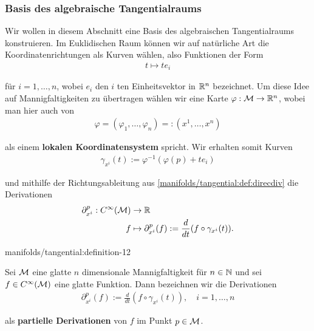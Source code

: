 \subsubsection{Basis des algebraische Tangentialraums}
\label{\detokenize{manifolds/tangential:basis-des-algebraische-tangentialraums}}\label{\detokenize{manifolds/tangential:sec-tpbasis}}
\par
Wir wollen in diesem Abschnitt eine Basis des algebraischen Tangentialraums konstruieren.
Im Euklidischen Raum können wir auf natürliche Art die Koordinatenrichtungen als Kurven wählen, also Funktionen der Form
\begin{align*}
t \mapsto t e_i
\end{align*}
\par
für \(i=1,\ldots,n\), wobei \(e_i\) den \(i\) ten Einheitsvektor in \(\mathbb{R}^n\) bezeichnet.
Um diese Idee auf Mannigfaltigkeiten zu übertragen wählen wir eine Karte \(\varphi:\mathcal{M}\to\mathbb{R}^n\), wobei man hier auch von
\begin{align*}
\varphi = (\varphi_1,\ldots,\varphi_n) =: (x^1,\ldots,x^n)
\end{align*}
\par
als einem \textbf{lokalen Koordinatensystem} spricht.
Wir erhalten somit Kurven
\begin{align*}
\gamma_{x^i}(t):= \varphi^{-1}(\varphi(p) + t e_i)
\end{align*}
\par
und mithilfe der Richtungsableitung aus \cref{manifolds/tangential:def:direcdiv} die Derivationen
\begin{align*}
\partial_{x^i}^p: C^\infty(\mathcal{M}) &\to \mathbb{R}\\
f &\mapsto \partial_{x^i}^p(f) := \frac{d}{dt} (f\circ \gamma_{x^i}(t)).
\end{align*}\begin{definition}{}{manifolds/tangential:definition-12}



\par
Sei \(\mathcal{M}\) eine glatte \(n\) dimensionale Mannigfaltigkeit für \(n\in\mathbb{N}\) und sei \(f \in C^\infty(\mathcal{M})\) eine glatte Funktion.
Dann bezeichnen wir die Derivationen
\begin{align*}
\partial_{x^i}^p (f) := \frac{d}{dt} (f\circ \gamma_{x^i}(t)), \quad i=1,\ldots,n
\end{align*}
\par
als \textbf{partielle Derivationen} von \(f\) im Punkt \(p \in \mathcal{M}\).
\end{definition}


